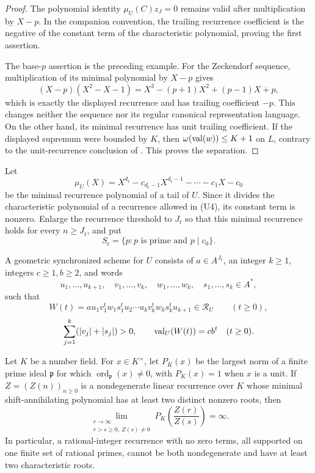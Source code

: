 \begin{proof}
  The polynomial identity \(\mu_U(C)z_J=0\) remains valid after
  multiplication by \(X-p\).  In the companion convention, the trailing
  recurrence coefficient is the negative of the constant term of the
  characteristic polynomial, proving the first assertion.

  The base-\(p\) assertion is the preceding example.  For the Zeckendorf
  sequence, multiplication of its minimal polynomial by \(X-p\) gives
  \[
    (X-p)(X^2-X-1)
      =X^3-(p+1)X^2+(p-1)X+p,
  \]
  which is exactly the displayed recurrence and has trailing coefficient
  \(-p\).  This changes neither the sequence nor its regular canonical
  representation language.  On the other hand, its minimal recurrence
  has unit trailing coefficient.  If the displayed supremum were bounded
  by \(K\), then
  \(\omega(\operatorname{val}(w))\le K+1\) on \(L\), contrary to the unit-recurrence
  conclusion of
  .  This proves the separation.
\end{proof}

Let
\[
  \mu_U(X)=X^{d_{\mathrm r}}-c_{d_{\mathrm r}-1}X^{d_{\mathrm r}-1}
    -\cdots-c_1X-c_0
\]
be the minimal recurrence polynomial of a tail of \(U\). Since it
divides the characteristic polynomial of a recurrence allowed in
\textup{(U4)}, its constant term is nonzero. Enlarge the recurrence
threshold to \(J_{\mathrm r}\) so that this minimal recurrence holds for
every \(n\ge J_{\mathrm r}\), and put
\[
  S_{\mathrm r}=\{p:p\text{ is prime and }p\mid c_0\}.
\]

\begin{definition}
  \label{def:geometric-synchronized-scheme}
  A geometric synchronized scheme for \(U\) consists of
  \(a\in A^{J_{\mathrm r}}\), an integer \(k\ge1\), integers
  \(c\ge1,b\ge2\), and words
  \[
    u_1,\ldots,u_{k+1},\quad
    v_1,\ldots,v_k,\quad w_1,\ldots,w_k,\quad
    s_1,\ldots,s_k\in A^\ast,
  \]
  such that
  \[
    W(t)=a u_1v_1^tw_1s_1^tu_2\cdots
      u_kv_k^tw_ks_k^tu_{k+1}\in\mathcal R_U
      \qquad(t\ge0),
  \]
  \[
    \sum_{j=1}^k(\lvert v_j \rvert+\lvert s_j \rvert)>0,
    \qquad \operatorname{val}_U(W(t))=cb^t\quad(t\ge0).
  \]
\end{definition}

\begin{lemma}
  \label{lem:evertse-quotient-support-input}
  Let \(K\) be a number field. For \(x\in K^\times\), let \(P_K(x)\)
  be the largest norm of a finite prime ideal \(\mathfrak p\) for which
  \(\operatorname{ord}_{\mathfrak p}(x)\ne0\), with \(P_K(x)=1\) when
  \(x\) is a unit. If \(Z=(Z(n))_{n\ge0}\) is a nondegenerate linear
  recurrence over \(K\) whose minimal shift-annihilating polynomial has
  at least two distinct nonzero roots, then
  \[
    \lim_{\substack{r\to\infty\\ r>s\ge0,\ Z(s)\ne0}}
      P_K\!\left(\frac{Z(r)}{Z(s)}\right)=\infty.
  \]
  In particular, a rational-integer recurrence with no zero terms, all
  supported on one finite set of rational primes, cannot be both
  nondegenerate and have at least two characteristic roots.
\end{lemma}

